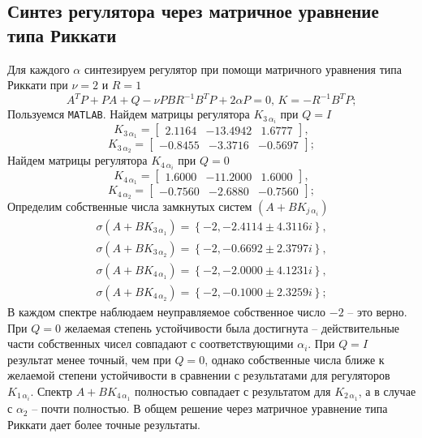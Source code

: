 \documentclass[a4paper, 12pt]{article}
\begin{document}
    \subsection{Синтез регулятора через матричное уравнение типа Риккати}
    Для каждого $\alpha$ синтезируем регулятор при помощи матричного уравнения типа Риккати при $\nu=2\text{ и }R=1$
    $$
    A^TP+PA+Q-\nu PBR^{-1}B^TP+2\alpha P=0,\,K=-R^{-1}B^TP;
    $$
    Пользуемся \texttt{MATLAB}. Найдем матрицы регулятора $K_{3\,\alpha_i}$ при $Q=I$
    $$
    K_{3\,\alpha_1}=\begin{bmatrix}
        2.1164  &-13.4942    &1.6777
    \end{bmatrix},
    $$
    $$
    K_{3\,\alpha_2}=\begin{bmatrix}
        -0.8455   &-3.3716   &-0.5697
    \end{bmatrix};
    $$
    Найдем матрицы регулятора $K_{4\,\alpha_i}$ при $Q=0$
    $$
    K_{4\,\alpha_1}=\begin{bmatrix}
        1.6000  &-11.2000    &1.6000
    \end{bmatrix},
    $$
    $$
    K_{4\,\alpha_2}=\begin{bmatrix}
        -0.7560   &-2.6880   &-0.7560
    \end{bmatrix};
    $$
    Определим собственные числа замкнутых систем $\left( A+BK_{j\,\alpha_i} \right)$
    \begin{align*}
    \sigma\left( A+BK_{3\,\alpha_1} \right)=\left\{ -2, -2.4114\pm4.3116i \right\},\\
    \sigma\left( A+BK_{3\,\alpha_2} \right)=\left\{ -2, -0.6692\pm2.3797i \right\},\\
    \sigma\left( A+BK_{4\,\alpha_1} \right)=\left\{ -2, -2.0000\pm4.1231i \right\},\\
    \sigma\left( A+BK_{4\,\alpha_2} \right)=\left\{ -2, -0.1000\pm2.3259i \right\};
    \end{align*}
    В каждом спектре наблюдаем неуправляемое собственное число $-2$ -- это верно. При $Q=0$ желаемая
    степень устойчивости была достигнута -- действительные части собственных чисел совпадают с соответствующими
    $\alpha_i$. При $Q=I$ результат менее точный, чем при $Q=0$, однако собственные числа ближе к желаемой степени устойчивости в сравнении с результатами для регуляторов $K_{1\,\alpha_i}$.
    Спектр $A+BK_{4\,\alpha_1}$ полностью совпадает с результатом для $K_{2\,\alpha_1}$, а в случае с $\alpha_2$ -- почти полностью.
    В общем решение через матричное уравнение типа Риккати дает более точные результаты.
\end{document}

